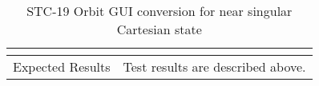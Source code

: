 \begin{table}[htbp!]
\begin{tabular}{|p{1.05 in} |p{4.75 in} |}
\begin{compactenum}
         \end{compactenum}
         \\ \hline
         Expected Results & Test results are described above.\\
      \hline
      \end{tabular}
      \label{Table:STC-19}
      \caption{STC-19 Orbit GUI conversion for near singular Cartesian state}
\end{table}

